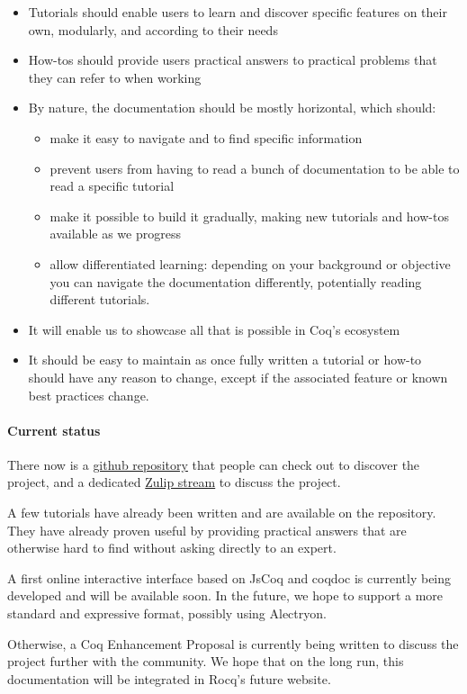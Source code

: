 \documentclass{easychair}
\begin{document}
\begin{itemize}[itemsep=0pt]
  \item Tutorials should enable users to learn and discover specific features on
        their own, modularly, and according to their needs
  \item How-tos should provide users practical answers to practical problems
        that they can refer to when working
  \item By nature, the documentation should be mostly horizontal, which should:
    \begin{itemize}[itemsep=0pt]
      \item make it easy to navigate and to find specific information
      \item prevent users from having to read a bunch of documentation to be
	    able to read a specific tutorial
      \item make it possible to build it gradually, making new tutorials and
	    how-tos available as we progress
      \item allow differentiated learning: depending on your background or
            objective you can navigate the documentation differently,
            potentially reading different tutorials.
    \end{itemize}
  \item It will enable us to showcase all that is possible in Coq's ecosystem
  \item It should be easy to maintain as once fully written a tutorial or how-to
        should have any reason to change, except if the associated feature or
        known best practices change.
\end{itemize}

\paragraph{Current status}

There now is a \href{https://github.com/Zimmi48/platform-docs}{github repository}
that people can check out to discover the project, and a dedicated
\href{https://coq.zulipchat.com/#narrow/stream/437203-Platform-docs}{Zulip stream}
to discuss the project.

A few tutorials have already been written and are available on the repository.
They have already proven useful by providing practical answers that are
otherwise hard to find without asking directly to an expert.

A first online interactive interface based on JsCoq and coqdoc is currently
being developed and will be available soon.
In the future, we hope to support a more standard and expressive format,
possibly using Alectryon.

Otherwise, a Coq Enhancement Proposal is currently being written to discuss the
project further with the community.
We hope that on the long run, this documentation will be integrated in Rocq's
future website.

\label{sect:bib}


\end{document}

